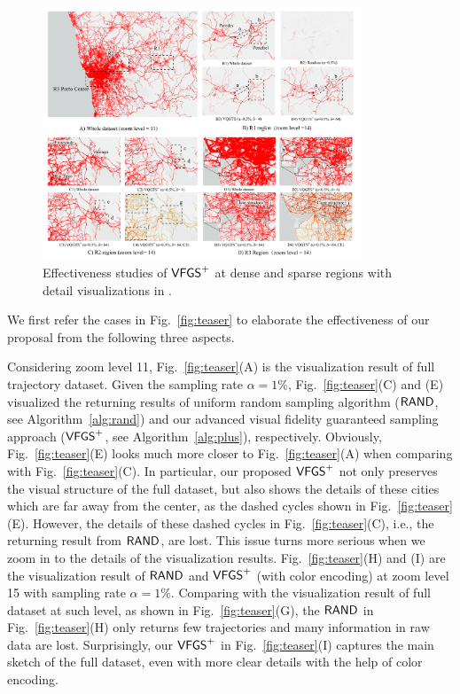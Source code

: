\begin{figure}[t]
	\centering
	\includegraphics[width=0.85\textwidth]{pictures/experiment_study/case_porto.pdf}
	\vspace{-3mm}
	\caption{Effectiveness studies of $\mathsf{VFGS}^{+}$ at dense and sparse regions with detail visualizations in \pt{}.}
	\label{fig:porto}
    \vspace{-6mm}
\end{figure}

We first refer the cases in Fig.~\ref{fig:teaser} to elaborate the effectiveness of our proposal from the following three aspects.

Considering zoom level 11, Fig.~\ref{fig:teaser}(A) is the visualization result of full \pt{} trajectory dataset.
Given the sampling rate $\alpha = 1\%$, Fig.~\ref{fig:teaser}(C) and (E) visualized the returning results of uniform random sampling algorithm ($\mathsf{RAND}$, see Algorithm~\ref{alg:rand})
and our advanced visual fidelity guaranteed sampling approach ($\mathsf{VFGS}^{+}$, see Algorithm~\ref{alg:plus}), respectively.
Obviously, Fig.~\ref{fig:teaser}(E) looks much more closer to Fig.~\ref{fig:teaser}(A) when comparing with Fig.~\ref{fig:teaser}(C).
In particular, our proposed $\mathsf{VFGS}^{+}$ not only preserves the visual structure of the full dataset,
but also shows the details of these cities which are far away from the center, as the dashed cycles shown in Fig.~\ref{fig:teaser}(E).
However, the details of these dashed cycles in Fig.~\ref{fig:teaser}(C), i.e., the returning result from $\mathsf{RAND}{}$, are lost.
This issue turns more serious when we zoom in to the details of the visualization results.
Fig.~\ref{fig:teaser}(H) and (I) are the visualization result of $\mathsf{RAND}$ and $\mathsf{VFGS}^{+}$  (with color encoding) at zoom level 15 with sampling rate $\alpha=1\%$.
Comparing with the visualization result of full dataset at such level, as shown in Fig.~\ref{fig:teaser}(G),
the $\mathsf{RAND}{}$ in Fig.~\ref{fig:teaser}(H) only returns few trajectories and many information in raw data are lost.
Surprisingly, our $\mathsf{VFGS}^{+}$ in Fig.~\ref{fig:teaser}(I) captures the main sketch of the full dataset, even with more clear details with the help of color encoding.

